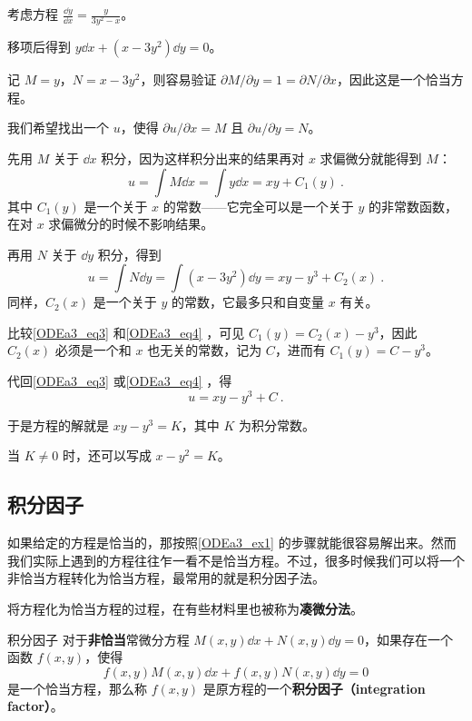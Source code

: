 \begin{example}{}\label{ODEa3_ex1}
考虑方程 $\frac{\dd y}{\dd x}=\frac{y}{3y^2-x}$。

移项后得到 $y\dd x+(x-3y^2)\dd y=0$。

记 $M=y$，$N=x-3y^2$，则容易验证 $\partial M/\partial y= 1 =\partial N/\partial x$，因此这是一个恰当方程。

我们希望找出一个 $u$，使得 $\partial u/\partial x=M$ 且 $\partial u/\partial y=N$。

先用 $M$ 关于 $\dd x$ 积分，因为这样积分出来的结果再对 $x$ 求偏微分就能得到 $M$：
\begin{equation}\label{ODEa3_eq3}
u=\int M\dd x=\int y\dd x=xy+C_1(y)~.
\end{equation}
其中 $C_1(y)$ 是一个关于 $x$ 的常数——它完全可以是一个关于 $y$ 的非常数函数，在对 $x$ 求偏微分的时候不影响结果。

再用 $N$ 关于 $\dd y$ 积分，得到
\begin{equation}\label{ODEa3_eq4}
u=\int N\dd y=\int (x-3y^2)\dd y=xy-y^3+C_2(x)~.
\end{equation}
同样，$C_2(x)$ 是一个关于 $y$ 的常数，它最多只和自变量 $x$ 有关。

比较\autoref{ODEa3_eq3} 和\autoref{ODEa3_eq4} ，可见 $C_1(y)=C_2(x)-y^3$，因此 $C_2(x)$ 必须是一个和 $x$ 也无关的常数，记为 $C$，进而有 $C_1(y)=C-y^3$。

代回\autoref{ODEa3_eq3} 或\autoref{ODEa3_eq4} ，得
\begin{equation}
u=xy-y^3+C~.
\end{equation}

于是方程的解就是 $xy-y^3=K$，其中 $K$ 为积分常数。

当 $K\not=0$ 时，还可以写成 $x-y^2=K$。

\end{example}


\subsection{积分因子}

如果给定的方程是恰当的，那按照\autoref{ODEa3_ex1} 的步骤就能很容易解出来。然而我们实际上遇到的方程往往乍一看不是恰当方程。不过，很多时候我们可以将一个非恰当方程转化为恰当方程，最常用的就是积分因子法。

将方程化为恰当方程的过程，在有些材料里也被称为\textbf{凑微分法}。

\begin{definition}{积分因子}
对于\textbf{非恰当}常微分方程 $M(x, y)\dd x+N(x, y)\dd y=0$，如果存在一个函数 $f(x, y)$，使得
\begin{equation}\label{ODEa3_eq5}
f(x, y)M(x, y)\dd x+f(x, y)N(x, y)\dd y=0
\end{equation}
是一个恰当方程，那么称 $f(x, y)$ 是原方程的一个\textbf{积分因子（integration factor）}。
\end{definition}

